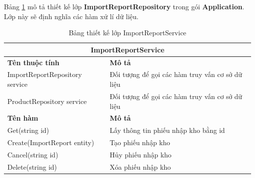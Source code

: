 \documentclass[../DoAn.tex]{subfiles}
\begin{document}
Bảng \ref{table:class-importreportservice} mô tả thiết kế lớp \textbf{ImportReportRepository} trong gói \textbf{Application}. Lớp này sẽ định nghĩa các hàm xử lí dữ liệu.
\begin{table}[H]
    \begin{tabularx}{\textwidth}{|l|X|}
        \hline
        \multicolumn{2}{|c|}{\textbf{ImportReportService}}                               \\ \hline
        \textbf{Tên thuộc tính}        & \textbf{Mô tả}                                  \\ \hline
        ImportReportRepository service & Đối tượng để gọi các hàm truy vấn cơ sở dữ liệu \\ \hline
        ProductRepository service      & Đối tượng để gọi các hàm truy vấn cơ sở dữ liệu \\ \hline
        \textbf{Tên hàm}               & \textbf{Mô tả}                                  \\ \hline
        Get(string id)                 & Lấy thông tin phiếu nhập kho bằng id            \\ \hline
        Create(ImportReport entity)    & Tạo phiếu nhập kho                              \\ \hline
        Cancel(string id)              & Hủy phiếu nhập kho                              \\ \hline
        Delete(string id)              & Xóa phiếu nhập kho                              \\ \hline
    \end{tabularx}
    \caption{Bảng thiết kế lớp ImportReportService}
    \label{table:class-importreportservice}
\end{table}
\end{document}
